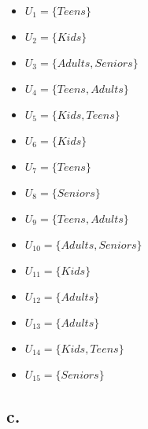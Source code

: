 \documentclass{article}
\begin{document}
\begin{itemize}
 \item $U_1 = \{Teens\}$
 \item $U_2 = \{Kids\}$
 \item $U_3 = \{Adults,Seniors\}$
 \item $U_4 = \{Teens,Adults\}$
 \item $U_5 = \{Kids,Teens\}$
 \item $U_6 = \{Kids\}$
 \item $U_7 = \{Teens\}$
 \item $U_8 = \{Seniors\}$
 \item $U_9 = \{Teens,Adults\}$
 \item $U_10 = \{Adults,Seniors\}$
 \item $U_11 = \{Kids\}$
 \item $U_12 = \{Adults\}$
 \item $U_13 = \{Adults\}$
 \item $U_14 = \{Kids,Teens\}$
 \item $U_15 = \{Seniors\}$
\end{itemize}

\subsection*{c.}
\end{document}
